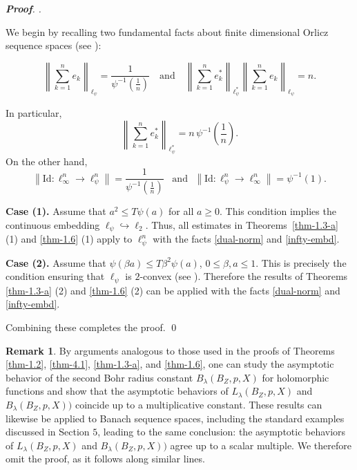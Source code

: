 \documentclass[a4paper,11pt, reqno]{amsart}
\theoremstyle{definition}
\newtheorem{rem}{Remark}[section]
\newenvironment{pf}[1][]{%
	\vskip 3mm
	\noindent
	\ifthenelse{\equal{#1}{}}%
	{{\slshape {\bf Proof}. }}%
	{{\slshape #1.} }%
}%
{\qed\bigskip}
\begin{document}
\begin{pf}
	We begin by recalling two fundamental facts about finite dimensional Orlicz sequence spaces (see \cite[p.~192]{defant-2003}):
	
	\begin{equation*}\label{orlicz-basic}
		\left\|\sum_{k=1}^{n} e_k \right\|_{\ell_\psi}
		= \frac{1}{\psi^{-1}\!\left(\frac{1}{n}\right)}
		\quad \text{and} \quad
		\left\|\sum_{k=1}^{n} e_k^* \right\|_{\ell_\psi^*}
		\left\|\sum_{k=1}^{n} e_k \right\|_{\ell_\psi}
		= n .
	\end{equation*}
	
	In particular,
	\begin{equation}\label{dual-norm}
		\left\|\sum_{k=1}^{n} e_k^* \right\|_{\ell_\psi^*}
		= n \, \psi^{-1}\!\left(\frac{1}{n}\right).
	\end{equation}
On the other hand, 
\begin{equation} \label{infty-embd}
	\left\|\mathrm{Id}:\ell_\infty^n \to \ell_\psi^n\right\|
	=
	\frac{1}{\psi^{-1}\!\left(\frac{1}{n}\right)}\,\,\,\,\, \mbox{and} \,\,\,\, \left\|\mathrm{Id}:\ell_\psi^n \to \ell_\infty^n\right\|
	=
	\psi^{-1}(1).
\end{equation}


	
	\medskip
	
	\noindent
	
	
	\smallskip
	
	\textbf{Case (1).}
	Assume that
	$	a^2 \le T \psi(a)$ for all  $ a \ge 0 
	$.
	This condition implies the continuous embedding
	$
	\ell_\psi \hookrightarrow \ell_2 
	$.
	Thus, all estimates in Theorems~\ref{thm-1.3-a} (1) and \ref{thm-1.6} (1)
	apply to $\ell_\psi^n$ with the facts \eqref{dual-norm} and \eqref{infty-embd}.
		
	\medskip
	
	\textbf{Case (2).}
	Assume that
	$
	\psi(\beta a) \le T \beta^2 \psi(a)$,	$0 \le \beta,a \le 1$.
	This is precisely the condition ensuring that $\ell_\psi$ is
	$2$-convex (see \cite[p.189]{defant-2003}). Therefore
	the results of Theorems \ref{thm-1.3-a} (2) and \ref{thm-1.6} (2)
	can be applied with the facts \eqref{dual-norm} and \eqref{infty-embd}.
	
	\medskip
	Combining these completes the proof.
\end{pf}
\begin{rem}
	By arguments analogous to those used in the proofs of Theorems  \ref{thm-1.2}, \ref{thm-4.1}, \ref{thm-1.3-a}, and \ref{thm-1.6}, one can study the asymptotic behavior of the second Bohr radius constant $B_{\lambda}(B_{Z}, p,X)$ for holomorphic functions and show that the asymptotic behaviors of $L_{\lambda}(B_{Z}, p,X)$ and $B_{\lambda}(B_{Z}, p,X))$ coincide up to a multiplicative constant. These results can likewise be applied to Banach sequence spaces, including the standard examples discussed in Section $5$, leading to the same conclusion: the asymptotic behaviors of $L_{\lambda}(B_{Z}, p,X)$ and $B_{\lambda}(B_{Z}, p,X))$ agree up to a scalar multiple. We therefore omit the proof, as it follows along similar lines. 
\end{rem}
\\
\end{document}
